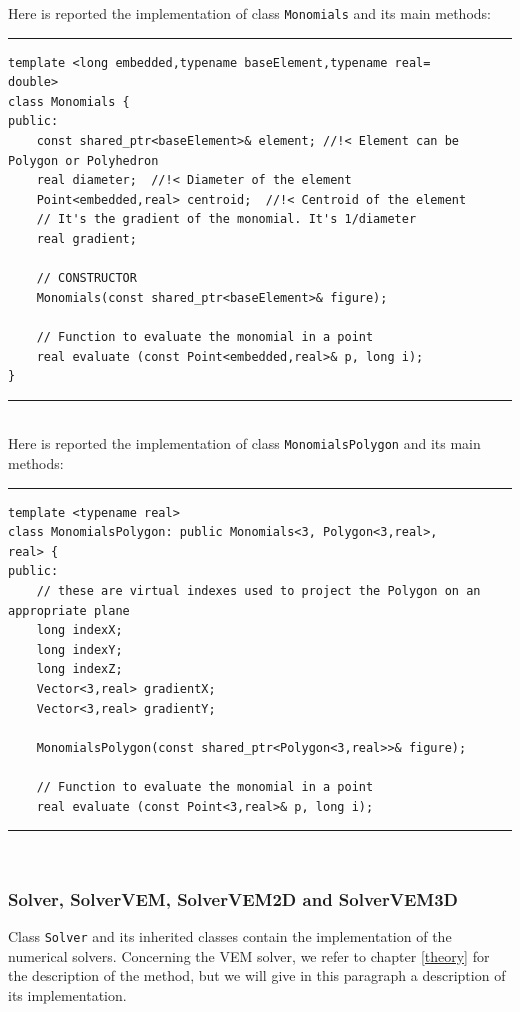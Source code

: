Here is reported the implementation of class \verb|Monomials| and its main methods:

\noindent\rule{12.7cm}{1pt}
\begin{lstlisting}[caption=File \texttt{Monomials.h}]
template <long embedded,typename baseElement,typename real=
double>
class Monomials {
public:
    const shared_ptr<baseElement>& element;	//!< Element can be Polygon or Polyhedron
    real diameter;  //!< Diameter of the element
    Point<embedded,real> centroid;  //!< Centroid of the element
    // It's the gradient of the monomial. It's 1/diameter
    real gradient;

    // CONSTRUCTOR
    Monomials(const shared_ptr<baseElement>& figure);

    // Function to evaluate the monomial in a point
    real evaluate (const Point<embedded,real>& p, long i);
}
\end{lstlisting}
\noindent\rule{12.7cm}{1pt}\\

Here is reported the implementation of class \verb|MonomialsPolygon| and its main methods:

\noindent\rule{12.7cm}{1pt}
\begin{lstlisting}[caption=File \texttt{MonomialsPolygon.h}]
template <typename real>
class MonomialsPolygon: public Monomials<3, Polygon<3,real>,
real> {
public:
    // these are virtual indexes used to project the Polygon on an appropriate plane
    long indexX;
    long indexY;
    long indexZ;
    Vector<3,real> gradientX;
    Vector<3,real> gradientY;
	
    MonomialsPolygon(const shared_ptr<Polygon<3,real>>& figure); 
    
    // Function to evaluate the monomial in a point
    real evaluate (const Point<3,real>& p, long i);
\end{lstlisting}

\noindent\rule{12.7cm}{1pt}\\

\subsubsection{Solver, SolverVEM, SolverVEM2D and SolverVEM3D}
Class \verb|Solver| and its inherited classes contain the implementation of the numerical solvers. Concerning the VEM solver, we refer to chapter \ref{theory} for the description of the method, but we will give in this paragraph a description of its implementation. 

